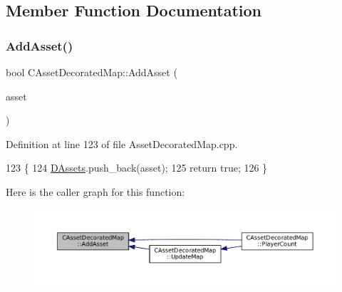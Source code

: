 \subsection{Member Function Documentation}
\hypertarget{classCAssetDecoratedMap_aaa798030159fd44251dd60aef9b00516}{}\label{classCAssetDecoratedMap_aaa798030159fd44251dd60aef9b00516} 
\subsubsection{\texorpdfstring{Add\+Asset()}{AddAsset()}}
{\footnotesize\ttfamily bool C\+Asset\+Decorated\+Map\+::\+Add\+Asset (\begin{DoxyParamCaption}\item[{std\+::shared\+\_\+ptr$<$ \hyperlink{classCPlayerAsset}{C\+Player\+Asset} $>$}]{asset }\end{DoxyParamCaption})}



Definition at line 123 of file Asset\+Decorated\+Map.\+cpp.


\begin{DoxyCode}
123                                                                     \{
124     \hyperlink{classCAssetDecoratedMap_a94eeed5b16141169b1ba6cb3842055aa}{DAssets}.push\_back(asset);
125     \textcolor{keywordflow}{return} \textcolor{keyword}{true};
126 \}
\end{DoxyCode}
Here is the caller graph for this function\+:
\nopagebreak
\begin{figure}[H]
\begin{center}
\leavevmode
\includegraphics[width=350pt]{classCAssetDecoratedMap_aaa798030159fd44251dd60aef9b00516_icgraph}
\end{center}
\end{figure}
\hypertarget{classCAssetDecoratedMap_aa71f42e162c1d3003248306bfa15e69d}{}\label{classCAssetDecoratedMap_aa71f42e162c1d3003248306bfa15e69d} 
